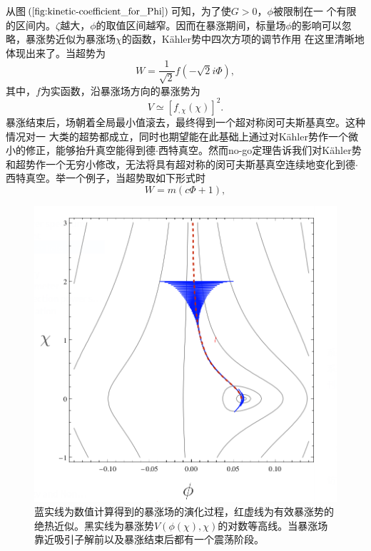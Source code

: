 从图$(\ref{fig:kinetic-coefficient_for_Phi})$可知，为了使$G>0$，$\phi$被限制在一
个有限的区间内。$\zeta$越大，$\phi$的取值区间越窄。因而在暴涨期间，标量场$\phi$的影响可以忽略，暴涨势近似为暴涨场$\chi$的函数，K\"ahler势中四次方项的调节作用
在这里清晰地体现出来了。当超势为
\begin{equation}
  W = \frac{1}{\sqrt{2}} f(-\sqrt{2}i\Phi),
\end{equation}
其中，$f$为实函数，沿暴涨场方向的暴涨势为
\begin{equation}
  V\simeq {\left[f_{,\chi}(\chi)\right]}^2.
\end{equation}
暴涨结束后，场朝着全局最小值滚去，最终得到一个超对称闵可夫斯基真空。这种情况对一
大类的超势都成立，同时也期望能在此基础上通过对K\"ahler势作一个微小的修正，能够抬升真空能得到德$\cdot$西特真空。然而no-go定理\citep{kallosh2014analytic}告诉我们对K\"ahler势和超势作一个无穷小修改，无法将具有超对称的闵可夫斯基真空连续地变化到德$\cdot$西特真空。举一个例子，当超势取如下形式时
\begin{equation}
  W=m(c\Phi+1),  
\end{equation}
\begin{figure}
  \centering
  \includegraphics[width=5in]{Img/potential-for-linear-superpotential.png}
  \caption{蓝实线为数值计算得到的暴涨场的演化过程，红虚线为有效暴涨势的绝热近似。黑实线为暴涨势$V(\phi(\chi),
  \chi)$的对数等高线。当暴涨场靠近吸引子解前以及暴涨结束后都有一个震荡阶段。}\label{fig:potential-for-linear-superpotential}
\end{figure}
